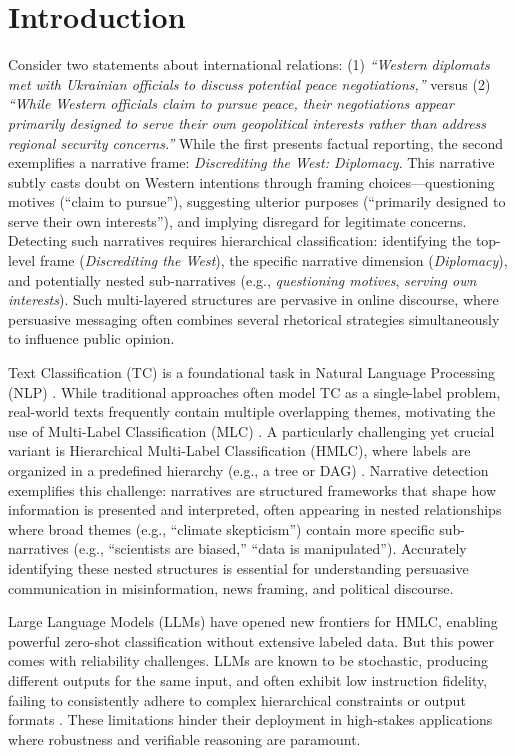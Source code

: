 \section{Introduction}

Consider two statements about international relations: (1) \textit{``Western diplomats met with Ukrainian officials to discuss potential peace negotiations,''} versus (2) \textit{``While Western officials claim to pursue peace, their negotiations appear primarily designed to serve their own geopolitical interests rather than address regional security concerns.''} While the first presents factual reporting, the second exemplifies a narrative frame: \textit{Discrediting the West: Diplomacy}. This narrative subtly casts doubt on Western intentions through framing choices—questioning motives (``claim to pursue''), suggesting ulterior purposes (``primarily designed to serve their own interests''), and implying disregard for legitimate concerns. Detecting such narratives requires hierarchical classification: identifying the top-level frame (\textit{Discrediting the West}), the specific narrative dimension (\textit{Diplomacy}), and potentially nested sub-narratives (e.g., \textit{questioning motives}, \textit{serving own interests}). Such multi-layered structures are pervasive in online discourse, where persuasive messaging often combines several rhetorical strategies simultaneously to influence public opinion.

Text Classification (TC) is a foundational task in Natural Language Processing (NLP) \citep{Zangari2024}. While traditional approaches often model TC as a single-label problem, real-world texts frequently contain multiple overlapping themes, motivating the use of Multi-Label Classification (MLC) \citep{Hu2025,TidakeSane2018}. A particularly challenging yet crucial variant is Hierarchical Multi-Label Classification (HMLC), where labels are organized in a predefined hierarchy (e.g., a tree or DAG) \citep{liu2023recentadvanceshierarchicalmultilabel}. Narrative detection exemplifies this challenge: narratives are structured frameworks that shape how information is presented and interpreted, often appearing in nested relationships where broad themes (e.g., ``climate skepticism'') contain more specific sub-narratives (e.g., ``scientists are biased,'' ``data is manipulated''). Accurately identifying these nested structures is essential for understanding persuasive communication in misinformation, news framing, and political discourse.

Large Language Models (LLMs) have opened new frontiers for HMLC, enabling powerful zero-shot classification without extensive labeled data. 
But this power comes with reliability challenges. 
LLMs are known to be stochastic, producing different outputs for the same input, and often exhibit low instruction fidelity, failing to consistently adhere to complex hierarchical constraints or output formats \citep{Qin2024InFoBench}. 
These limitations hinder their deployment in high-stakes applications where robustness and verifiable reasoning are paramount.

